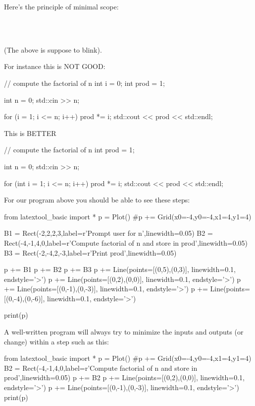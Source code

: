 

\newpage{}

Here's the principle of minimal scope:
\begin{center}
\\
\\
\end{center}

(The above is suppose to blink).

For instance this is NOT GOOD:
\begin{console}
// compute the factorial of n
int i = 0;
int prod = 1;

int n = 0;
std::cin >> n;

for (i = 1; i <= n; i++)
{
    prod *= i;
}
std::cout << prod << std::endl;
\end{console}

This is BETTER

\begin{console}
// compute the factorial of n
int prod = 1;

int n = 0;
std::cin >> n;

for (int i = 1; i <= n; i++)
{    
     prod *= i;
}
std::cout << prod << std::endl;
\end{console}

For our program above you should be able to see these steps:

\begin{python}
from latextool_basic import *
p = Plot()
#p += Grid(x0=-4,y0=-4,x1=4,y1=4)

B1 = Rect(-2,2,2,3,label=r'Prompt user for n',linewidth=0.05)
B2 = Rect(-4,-1,4,0,label=r'Compute factorial of n and store in prod',linewidth=0.05)
B3 = Rect(-2,-4,2,-3,label=r'Print prod',linewidth=0.05)

p += B1
p += B2
p += B3
p += Line(points=[(0,5),(0,3)], linewidth=0.1, endstyle='>')
p += Line(points=[(0,2),(0,0)], linewidth=0.1, endstyle='>')
p += Line(points=[(0,-1),(0,-3)], linewidth=0.1, endstyle='>')
p += Line(points=[(0,-4),(0,-6)], linewidth=0.1, endstyle='>')

print(p)
\end{python}

A well-written program will always try to minimize the inputs and
outputs (or change) within a step such as this:
\begin{python}
from latextool_basic import *
p = Plot()
#p += Grid(x0=-4,y0=-4,x1=4,y1=4)
B2 = Rect(-4,-1,4,0,label=r'Compute factorial of n and store in prod',linewidth=0.05)
p += B2
p += Line(points=[(0,2),(0,0)], linewidth=0.1, endstyle='>')
p += Line(points=[(0,-1),(0,-3)], linewidth=0.1, endstyle='>')
print(p)
\end{python}


